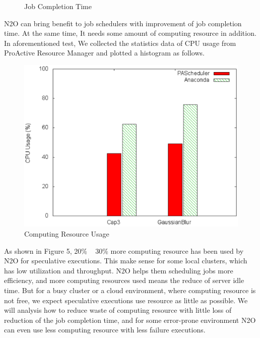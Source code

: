 \begin{figure}
\centering
{}
\caption{Job Completion Time}
\label{figure:completiontime}
\end{figure}

N2O can bring benefit to job schedulers with improvement of job completion time. At the same time, It needs some amount of computing resource in addition. In aforementioned test, We collected the statistics data of CPU usage from ProActive Resource Manager and plotted a histogram as follows.

\begin{figure}
\centering
\includegraphics[width=0.62\columnwidth]{figures/resource_usage.eps}
\caption{Computing Resource Usage}
\label{figure:resourceusage}
\end{figure}

As shown in Figure 5, 20\% ~ 30\% more computing resource has been used by N2O for speculative executions. This make sense for some local clusters, which has low utilization and throughput. N2O helps them scheduling jobs more efficiency, and more computing resources used means the reduce of server idle time. But for a busy cluster or a cloud environment, where computing resource is not free, we expect speculative executions use resource as little as possible. We will analysis how to reduce waste of computing resource with little loss of reduction of the job completion time, and for some error-prone environment N2O can even use less computing resource with less failure executions.


